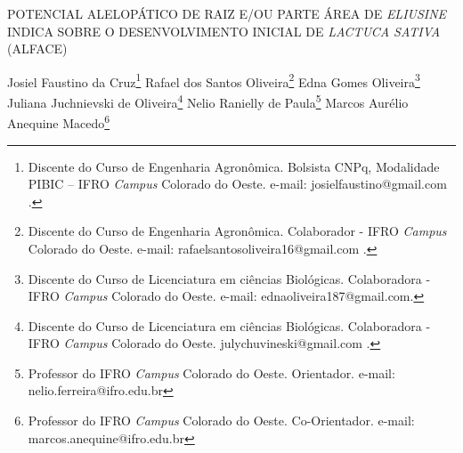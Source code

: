 \documentclass[article,12pt,onesidea,4paper,english,brazil]{abntex2}
\begin{document}
	
	
	\frenchspacing 
	
	\begin{center}
		\LARGE POTENCIAL ALELOPÁTICO DE RAIZ E/OU PARTE ÁREA DE \textit{ELIUSINE} INDICA SOBRE O DESENVOLVIMENTO INICIAL DE \textit{LACTUCA SATIVA} (ALFACE)
		
		\normalsize
		Josiel Faustino da Cruz\footnote{Discente do Curso de Engenharia Agronômica. Bolsista CNPq, Modalidade PIBIC – IFRO \textit{Campus} Colorado do Oeste. e-mail: josielfaustino@gmail.com .} 
		Rafael dos Santos Oliveira\footnote{Discente do Curso de Engenharia Agronômica. Colaborador - IFRO \textit{Campus} Colorado do Oeste. e-mail: rafaelsantosoliveira16@gmail.com .} 
		Edna Gomes Oliveira\footnote{Discente do Curso de Licenciatura em ciências Biológicas. Colaboradora - IFRO \textit{Campus} Colorado do Oeste. e-mail: ednaoliveira187@gmail.com.} 
		Juliana Juchnievski de Oliveira\footnote{Discente do Curso de Licenciatura em ciências Biológicas. Colaboradora - IFRO \textit{Campus} Colorado do Oeste. julychuvineski@gmail.com .}
		Nelio Ranielly de Paula\footnote{Professor do IFRO \textit{Campus} Colorado do Oeste. Orientador. e-mail: nelio.ferreira@ifro.edu.br}
		Marcos Aurélio Anequine Macedo\footnote{Professor do IFRO \textit{Campus} Colorado do Oeste. Co-Orientador. e-mail: marcos.anequine@ifro.edu.br}
		 
	\end{center}
	
\end{document}
